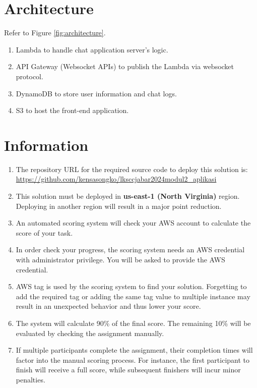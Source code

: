 \documentclass{article}
\begin{document}
\section{Architecture}\label{architecture}

Refer to Figure \ref{fig:architecture}.
\begin{enumerate}
    \item Lambda to handle chat application server's logic.
    \item API Gateway (Websocket APIs) to publish the Lambda via websocket protocol.
    \item DynamoDB to store user information and chat logs.
    \item S3 to host the front-end application.
\end{enumerate}

\section{Information}\label{information}

\begin{enumerate}
  \item The repository URL for the required source code to deploy this solution is:\\
  \href{https://github.com/kensasongko/lksccjabar2024modul2_aplikasi}{https://github.com/kensasongko/lksccjabar2024modul2\_aplikasi}
  \item This solution must be deployed in \textbf{us-east-1 (North Virginia)} region. Deploying in another region will result in a major point reduction.
  \item An automated scoring system will check your AWS account to calculate the score of your task.
  \item In order check your progress, the scoring system needs an AWS credential with administrator privilege. You will be asked to provide the AWS credential.
  \item AWS tag is used by the scoring system to find your solution. Forgetting to add the required tag or adding the same tag value to multiple instance may result in an unexpected behavior and thus lower your score.
  \item The system will calculate 90\% of the final score. The remaining 10\% will be evaluated by checking the assignment manually.
  \item If multiple participants complete the assignment, their completion times will factor into the manual scoring process. For instance, the first participant to finish will receive a full score, while subsequent finishers will incur minor penalties.
\end{enumerate}
\end{document}
